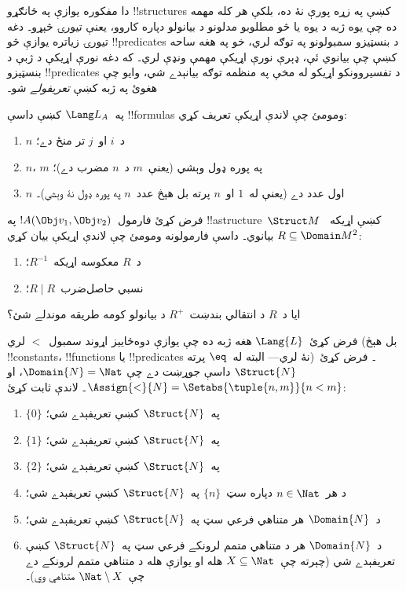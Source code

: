\documentclass[../../../include/open-logic-section]{subfiles}
\begin{document}
\begin{explain}
دا مفکوره يوازې په ځانګړو !!{structure}s کښې په زړه پورې نۀ ده،
بلکې هر کله مهمه ده چې يوه ژبه د يوه يا څو مطلوبو مدلونو د بيانولو
دپاره کاروو، يعنې تيورۍ څېړو۔ دغه تيورۍ زياتره يوازې څو
!!{predicate}s د بنسټيزو سمبولونو په توګه لري، خو په هغه ساحه کښې
چې بيانوي ئې، ډېرې نورې اړيکې مهمې ونډې لري۔ که دغه نورې اړيکې د ژبې
د بنسټيزو !!{predicate}s د تفسيروونکو اړيکو له مخې په منظمه توګه
بيانېدے شي، وايو چې هغوئ په ژبه کښې \emph{تعريفولے} شو۔
\end{explain}

\begin{prob}
په~$\Lang L_A$ کښې داسې !!{formula}s ومومئ چې لاندې اړيکې تعريف کړي:
\begin{enumerate}
\item $n$ د~$i$ او~$j$ تر منځ دے؛
\item $n$، $m$ په پوره ډول وېشي (يعنې~$m$ د~$n$ مضرب دے)؛
\item $n$ اول عدد دے (يعنې له~$1$ او~$n$ پرته بل هېڅ عدد~$n$ په پوره
  ډول نۀ وېشي)۔
\end{enumerate}
\end{prob}

\begin{prob}
فرض کړئ فارمول~$!A(\Obj v_1, \Obj v_2)$ په
!!a{structure}~$\Struct M$ کښې اړيکه~$R \subseteq \Domain M^2$
بيانوي۔ داسې فارمولونه ومومئ چې لاندې اړيکې بيان کړي:
\begin{enumerate}
\item د~$R$ معکوسه اړيکه~$R^{-1}$؛
\item نسبي حاصل‌ضرب~$R \mid R$؛
\end{enumerate}
ايا د~$R$ د انتقالي بندښت~$R^+$ د بيانولو کومه طريقه موندلے شئ؟
\end{prob}

\begin{prob}
فرض کړئ~$\Lang{L}$ هغه ژبه ده چې يوازې دوه‌ځاييز اړوند سمبول~$<$
لري (بل هېڅ !!{constant}s، !!{function}s يا !!{predicate}s نۀ لري---
البته له~$\eq$ پرته)۔ فرض کړئ~$\Struct{N}$ داسې جوړښت دے چې
$\Domain{N} = \Nat$، او
$\Assign{<}{N} = \Setabs{\tuple{n,m}}{n < m}$۔ لاندې ثابت کړئ:
\begin{enumerate}
\item $\{ 0 \}$ په~$\Struct{N}$ کښې تعريفېدے شي؛
\item $\{ 1 \}$ په~$\Struct{N}$ کښې تعريفېدے شي؛
\item $\{ 2 \}$ په~$\Struct{N}$ کښې تعريفېدے شي؛
\item د هر~$n \in \Nat$ دپاره سټ~$\{ n \}$ په~$\Struct{N}$ کښې
  تعريفېدے شي؛
\item د~$\Domain{N}$ هر متناهي فرعي سټ په~$\Struct{N}$ کښې
  تعريفېدے شي؛
\item د~$\Domain{N}$ هر د متناهي متمم لرونکے فرعي سټ په~$\Struct{N}$ کښې
  تعريفېدے شي (چېرته چې~$X \subseteq \Nat$ هله او يوازې هله
  د متناهي متمم لرونکے دے چې~$\Nat \setminus X$ متناهي وي)۔
\end{enumerate}
\end{prob}
\end{document}
